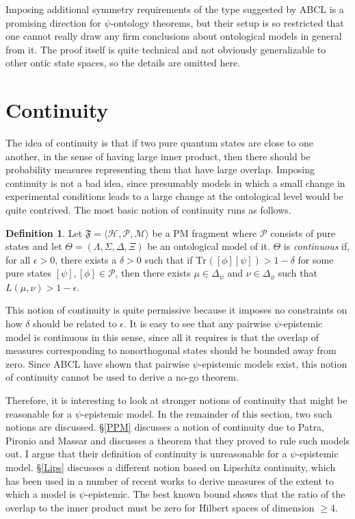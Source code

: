 \documentclass[DIV=calc,paper=a4,fontsize=11pt,twocolumn]{scrartcl} %
\theoremstyle{definition}
\newtheorem{definition}{Definition}[section]
\theoremstyle{plain}
\newcommand{\Proj}[1]{\ensuremath{\left [ #1 \right ]}}
\newcommand{\Hilb}[1][]{\ensuremath{\mathcal{H}_{#1}}}
\newcommand{\Tr}[2][]{\ensuremath{\text{Tr}_{#1} \left ( #2 \right )}}
\begin{document}
Imposing additional symmetry requirements of the type suggested by
ABCL is a promising direction for $\psi$-ontology theorems, but their
setup is so restricted that one cannot really draw any firm
conclusions about ontological models in general from it.  The proof
itself is quite technical and not obviously generalizable to other
ontic state spaces, so the details are omitted here.

\section{Continuity}

\label{Cont}

The idea of continuity is that if two pure quantum states are close to
one another, in the sense of having large inner product, then there
should be probability measures representing them that have large
overlap.  Imposing continuity is not a bad idea, since presumably
models in which a small change in experimental conditions leads to a
large change at the ontological level would be quite contrived.  The
most basic notion of continuity runs as follows.

\begin{definition}
\label{def:Cont:cont}
Let $\mathfrak{F} = \langle \Hilb, \mathcal{P}, \mathcal{M} \rangle$
be a PM fragment where $\mathcal{P}$ consists of pure states and let
$\Theta = (\Lambda, \Sigma, \Delta, \Xi)$ be an ontological model of
it.  $\Theta$ is \emph{continuous} if, for all $\epsilon > 0$, there
exists a $\delta > 0$ such that if $\Tr{\Proj{\phi}\Proj{\psi}} > 1
- \delta$ for some pure states $\Proj{\psi}, \Proj{\phi} \in
\mathcal{P}$, then there exists $\mu \in \Delta_{\psi}$ and $\nu \in
\Delta_{\phi}$ such that $L(\mu,\nu) > 1 - \epsilon$.
\end{definition}

This notion of continuity is quite permissive because it imposes no
constraints on how $\delta$ should be related to $\epsilon$.  It is
easy to see that any pairwise $\psi$-epistemic model is continuous in
this sense, since all it requires is that the overlap of measures
corresponding to nonorthogonal states should be bounded away from
zero.  Since ABCL have shown that pairwise $\psi$-epistemic models
exist, this notion of continuity cannot be used to derive a no-go
theorem.

Therefore, it is interesting to look at stronger notions of continuity
that might be reasonable for a $\psi$-epistemic model.  In the
remainder of this section, two such notions are discussed.
\S\ref{PPM} discusses a notion of continuity due to Patra, Pironio and
Massar \cite{Patra2013a} and discusses a theorem that they proved to
rule such models out.  I argue that their definition of continuity is
unreasonable for a $\psi$-epistemic model.  \S\ref{Lips} discusses a
different notion based on Lipschitz continuity, which has been used in
a number of recent works to derive measures of the extent to which a
model is $\psi$-epistemic.  The best known bound shows that the ratio
of the overlap to the inner product must be zero for Hilbert spaces of
dimension $\geq 4$.
\end{document}
